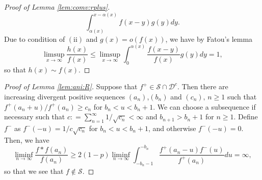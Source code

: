 \documentclass[12pt,leqno]{amsart}
\newcommand{\cals}{{\mathcal S}}
\newcommand{\call}{{\mathcal L}}
\newcommand{\cald}{{\mathcal D}}
\newcommand{\1}{{\mathbf 1}}
\begin{document}
\begin{proof}[Proof of Lemma \ref{lem:comv:rplus}]
\[ \int_{\alpha(x)}^{x-\alpha(x)} f(x-y)g(y)dy.  
\]
Due to condition of $(\mathrm{ii})$ and $g(x)=o(f(x))$, 
we have by Fatou's lemma 
\[
 \limsup_{x\to\infty} \frac{h(x)}{f(x)} \le \limsup_{x\to\infty} \int_0^{\alpha(x)} \frac{f(x-y)}{f(x)}g(y)dy =1,
\]
so that $h(x)\sim f(x)$. %
\end{proof}

\begin{proof}[Proof of Lemma \ref{lem:ani:R}]
Suppose that $f^+ \in \cals\cap \cald^c$. Then there are increasing divergent positive sequences 
$(a_n)$,$(b_n)$ and $(c_n),\,n\ge 1$ such that
$f^+(a_n+u)/f^+(a_n)\ge c_n$ for $b_n < u <b_n+1$. %
We can choose a subsequence if necessary such that
$c: =\sum_{n=1}^{\infty} 1/\sqrt{c_n} <\infty$ and $b_{n+1} >b_n +1$ for $n \ge 1$.
Define $f^-$ as
$f^-(-u)=1/c \sqrt{ c_n}$ for $b_n <  u <b_n+1 $, and %
otherwise $f^-(-u)=0$.
Then, we have
$$\liminf_{n \to \infty}\frac{ f*f(a_n)}{f(a_n)}\ge
2(1-p)
\liminf_{n \to \infty}\int_{-b_n-1}^{-b_n}\frac{ f^+(a_n-u)f^-(u)}{f^+(a_n)}du=\infty,$$
so that we see that $f \notin \cals$.
\end{proof}
\end{document}
